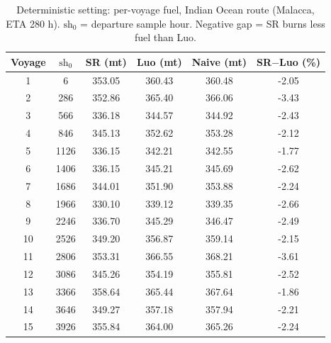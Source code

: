\documentclass[review,authoryear]{elsarticle}
\begin{document}
\begin{table}[H]
\centering
\caption{Deterministic setting: per-voyage fuel, Indian Ocean route (Malacca, ETA 280 h). $\mathrm{sh}_0$ = departure
sample hour. Negative gap = SR burns less fuel than Luo.}
\label{tab:det-r1}
\begin{tabular}{
  S[table-format=2.0]
  S[table-format=4.0]
  S[table-format=3.2]
  S[table-format=3.2]
  S[table-format=3.2]
  S[table-format=-1.2]
}
\toprule
{Voyage} & {$\mathrm{sh}_0$} & {SR (mt)} & {Luo (mt)} & {Naive (mt)} & {SR$-$Luo (\%)} \\
  & 6    & 353.05 & 360.43 & 360.48 & -2.05 \\
2  & 286  & 352.86 & 365.40 & 366.06 & -3.43 \\
3  & 566  & 336.18 & 344.57 & 344.92 & -2.43 \\
4  & 846  & 345.13 & 352.62 & 353.28 & -2.12 \\
5  & 1126 & 336.15 & 342.21 & 342.55 & -1.77 \\
6  & 1406 & 336.15 & 345.21 & 345.69 & -2.62 \\
7  & 1686 & 344.01 & 351.90 & 353.88 & -2.24 \\
8  & 1966 & 330.10 & 339.12 & 339.35 & -2.66 \\
9  & 2246 & 336.70 & 345.29 & 346.47 & -2.49 \\
10 & 2526 & 349.20 & 356.87 & 359.14 & -2.15 \\
11 & 2806 & 353.31 & 366.55 & 368.21 & -3.61 \\
12 & 3086 & 345.26 & 354.19 & 355.81 & -2.52 \\
13 & 3366 & 358.64 & 365.44 & 367.64 & -1.86 \\
14 & 3646 & 349.27 & 357.18 & 357.94 & -2.21 \\
15 & 3926 & 355.84 & 364.00 & 365.26 & -2.24 \\
\bottomrule
\end{tabular}
\end{table}
\end{document}
